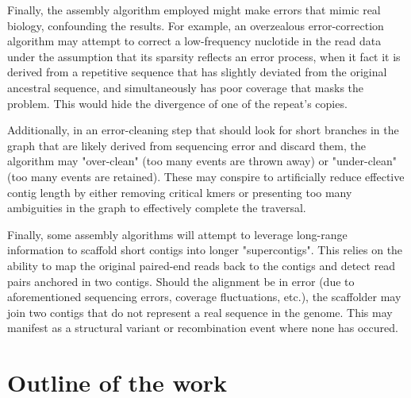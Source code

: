 Finally, the assembly algorithm employed might make errors that mimic real biology, confounding the results.  For example, an overzealous error-correction algorithm may attempt to correct a low-frequency nuclotide in the read data under the assumption that its sparsity reflects an error process, when it fact it is derived from a repetitive sequence that has slightly deviated from the original ancestral sequence, and simultaneously has poor coverage that masks the problem.  This would hide the divergence of one of the repeat's copies.

Additionally, in an error-cleaning step that should look for short branches in the graph that are likely derived from sequencing error and discard them, the algorithm may "over-clean" (too many events are thrown away) or "under-clean" (too many events are retained).  These may conspire to artificially reduce effective contig length by either removing critical kmers or presenting too many ambiguities in the graph to effectively complete the traversal.

Finally, some assembly algorithms will attempt to leverage long-range information to scaffold short contigs into longer "supercontigs".  This relies on the ability to map the original paired-end reads back to the contigs and detect read pairs anchored in two contigs.  Should the alignment be in error (due to aforementioned sequencing errors, coverage fluctuations, etc.), the scaffolder may join two contigs that do not represent a real sequence in the genome.  This may manifest as a structural variant or recombination event where none has occured.

\section{Outline of the work}
